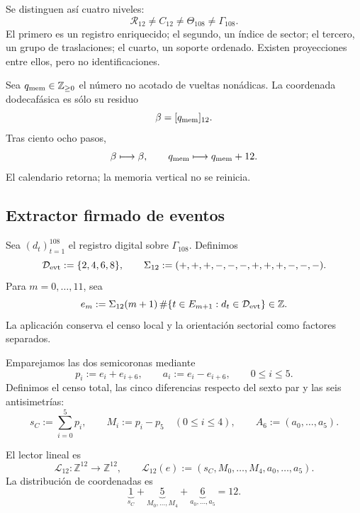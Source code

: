 {Se distinguen así cuatro niveles:
\begin{equation}
 \boxed{
 \mathcal R_{12}
 \neq C_{12}
 \neq\Theta_{108}
 \neq\Gamma_{108}.}
 \label{p12-83-c1-s9:eq:u006d-cuatro-objetos}
\end{equation}
El primero es un registro enriquecido; el segundo, un índice de sector; el
tercero, un grupo de traslaciones; el cuarto, un soporte ordenado. Existen
proyecciones entre ellos, pero no identificaciones.

Sea \(q_{\rm mem}\in\mathbb Z_{\geq0}\) el número no acotado de vueltas
nonádicas. La coordenada dodecafásica es sólo su residuo
\[
 \beta=[q_{\rm mem}]_{12}.
\]
Tras ciento ocho pasos,
\[
 \beta\longmapsto\beta,
 \qquad
 q_{\rm mem}\longmapsto q_{\rm mem}+12.
\]
El calendario retorna; la memoria vertical no se reinicia.

\subsection{Extractor firmado de eventos}

Sea \((d_t)_{t=1}^{108}\) el registro digital sobre
\(\Gamma_{108}\). Definimos
\begin{equation}
 \mathcal D_{\rm evt}:=\{2,4,6,8\},
 \qquad
 \Sigma_{12}:=(+,+,+,-,-,-,+,+,+,-,-,-).
 \label{p12-83-c1-s9:eq:u006d-datos-eventos}
\end{equation}
Para \(m=0,\ldots,11\), sea
\begin{equation}
 e_m:=
 \Sigma_{12}(m+1)\,
 \#\{t\in E_{m+1}:d_t\in\mathcal D_{\rm evt}\}
 \in\mathbb Z.
 \label{p12-83-c1-s9:eq:u006d-eventos-firmados}
\end{equation}
La aplicación conserva el censo local y la orientación sectorial como
factores separados.

Emparejamos las dos semicoronas mediante
\begin{equation}
 p_i:=e_i+e_{i+6},
 \qquad
 a_i:=e_i-e_{i+6},
 \qquad 0\leq i\leq5.
 \label{p12-83-c1-s9:eq:u006d-pares-antipodales}
\end{equation}
Definimos el censo total, las cinco diferencias respecto del sexto par y
las seis antisimetrías:
\begin{equation}
 s_C:=\sum_{i=0}^{5}p_i,
 \qquad
 M_i:=p_i-p_5\quad(0\leq i\leq4),
 \qquad
 A_6:=(a_0,\ldots,a_5).
 \label{p12-83-c1-s9:eq:u006d-coordenadas-uno-cinco-seis}
\end{equation}

\begin{definition}
\label{p12-83-c1-s9:def:u006d-lector-integral}
El lector lineal es
\begin{equation}
 \mathcal L_{12}:\mathbb Z^{12}\longrightarrow\mathbb Z^{12},
 \qquad
 \mathcal L_{12}(e)
 :=
 (s_C,M_0,\ldots,M_4,a_0,\ldots,a_5).
 \label{p12-83-c1-s9:eq:u006d-lector-l12}
\end{equation}
La distribución de coordenadas es
\begin{equation}
 \underbrace{1}_{s_C}
 +\underbrace{5}_{M_0,\ldots,M_4}
 +\underbrace{6}_{a_0,\ldots,a_5}
 =12.
 \label{p12-83-c1-s9:eq:u006d-uno-cinco-seis}
\end{equation}
\end{definition}

}
